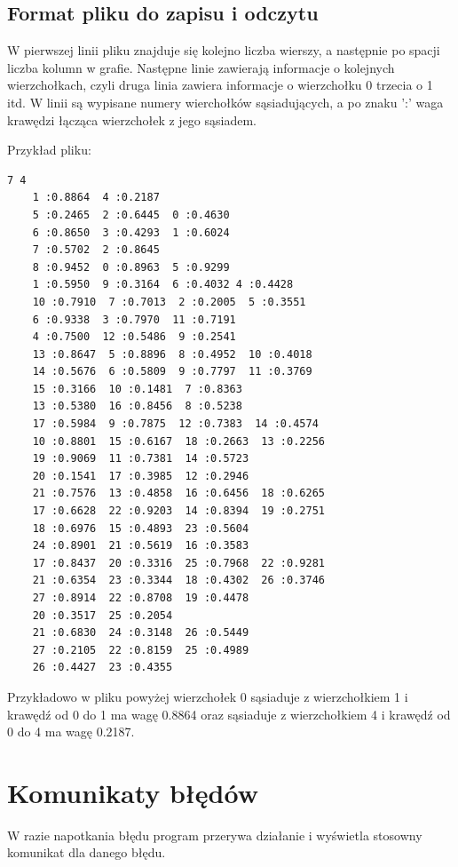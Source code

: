 \documentclass{article}
\begin{document}
\subsection{Format pliku do zapisu i odczytu}
W pierwszej linii pliku znajduje się kolejno liczba wierszy, a następnie po spacji liczba kolumn w grafie. Następne linie zawierają informacje o kolejnych wierzchołkach, czyli druga linia zawiera informacje o wierzchołku 0 trzecia o 1 itd. W linii są wypisane numery wierchołków sąsiadujących, a po znaku ':' waga krawędzi łącząca wierzchołek z jego sąsiadem.

\medskip

\noindent Przykład pliku:
\begin{lstlisting}
7 4
    1 :0.8864  4 :0.2187
    5 :0.2465  2 :0.6445  0 :0.4630 
    6 :0.8650  3 :0.4293  1 :0.6024
    7 :0.5702  2 :0.8645 
    8 :0.9452  0 :0.8963  5 :0.9299 
    1 :0.5950  9 :0.3164  6 :0.4032 4 :0.4428 
    10 :0.7910  7 :0.7013  2 :0.2005  5 :0.3551
    6 :0.9338  3 :0.7970  11 :0.7191 
    4 :0.7500  12 :0.5486  9 :0.2541 
    13 :0.8647  5 :0.8896  8 :0.4952  10 :0.4018 
    14 :0.5676  6 :0.5809  9 :0.7797  11 :0.3769
    15 :0.3166  10 :0.1481  7 :0.8363 
    13 :0.5380  16 :0.8456  8 :0.5238
    17 :0.5984  9 :0.7875  12 :0.7383  14 :0.4574
    10 :0.8801  15 :0.6167  18 :0.2663  13 :0.2256
    19 :0.9069  11 :0.7381  14 :0.5723
    20 :0.1541  17 :0.3985  12 :0.2946
    21 :0.7576  13 :0.4858  16 :0.6456  18 :0.6265
    17 :0.6628  22 :0.9203  14 :0.8394  19 :0.2751
    18 :0.6976  15 :0.4893  23 :0.5604
    24 :0.8901  21 :0.5619  16 :0.3583 
    17 :0.8437  20 :0.3316  25 :0.7968  22 :0.9281
    21 :0.6354  23 :0.3344  18 :0.4302  26 :0.3746
    27 :0.8914  22 :0.8708  19 :0.4478
    20 :0.3517  25 :0.2054
    21 :0.6830  24 :0.3148  26 :0.5449
    27 :0.2105  22 :0.8159  25 :0.4989
    26 :0.4427  23 :0.4355
\end{lstlisting}
Przykładowo w pliku powyżej wierzchołek 0 sąsiaduje z wierzchołkiem 1 i krawędź od 0 do 1 ma wagę 0.8864 oraz sąsiaduje z wierzchołkiem 4 i krawędź od 0 do 4 ma wagę 0.2187.
\section{Komunikaty błędów}

W razie napotkania błędu program przerywa działanie i wyświetla stosowny komunikat dla danego błędu.

\medskip
\end{document}
